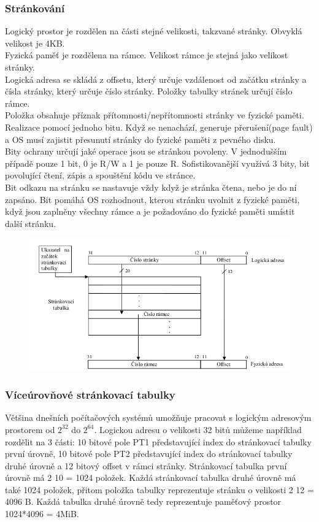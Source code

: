 \subsubsection*{Stránkování}
Logický prostor je rozdělen na části stejné velikosti, takzvané stránky. Obvyklá velikost je 4KB.\\
Fyzická paměť je rozdělena na rámce. Velikost rámce je stejná jako velikost stránky. \\
Logická adresa se skládá z offsetu, který určuje vzdálenost od začátku stránky a čísla stránky, který určuje číslo stránky. Položky tabulky stránek určují číslo rámce.\\
Položka obsahuje příznak přítomnosti/nepřítomnosti stránky ve fyzické paměti. Realizace pomocí jednoho bitu. Když se nenachází, generuje přerušení(page fault) a OS musí zajistit přesunutí stránky do fyzické paměti z pevného disku.\\
Bity ochrany určují jaké operace jsou se stránkou povoleny. V jednodušším případě pouze 1 bit, 0 je R/W a 1 je pouze R. Sofistikovanější využívá 3 bity, bit povolující čtení, zápis a spouštění kódu ve stránce. \\
Bit odkazu na stránku se nastavuje vždy když je stránka čtena, nebo je do ní zapsáno. Bit pomáhá OS rozhodnout, kterou stránku uvolnit z fyzické paměti, když jsou zaplněny všechny rámce a je požadováno do fyzické paměti umístit další stránku. \\
\begin{figure}[h!]
    \centering
    \includegraphics[scale = 0.5]{img/Strankovani.png}
\end{figure}

\subsubsection*{Víceúrovňové stránkovací tabulky}
Většina dnešních počítačových systémů umožňuje pracovat s logickým adresovým prostorem od $2^32$ do $2^64$.
Logickou adresu o velikosti 32 bitů můžeme například rozdělit na 3 části: 10 bitové pole PT1 představující index do stránkovací tabulky první úrovně, 10 bitové pole PT2 představující index do stránkovací tabulky druhé úrovně a 12 bitový offset v rámci stránky. Stránkovací tabulka první úrovně má 2 10 = 1024 položek. Každá stránkovací tabulka druhé úrovně má také 1024 položek, přitom položka tabulky reprezentuje stránku o velikosti 2 12 = 4096 B. Každá tabulka druhé úrovně tedy reprezentuje paměťový prostor 1024*4096 = 4MiB.

